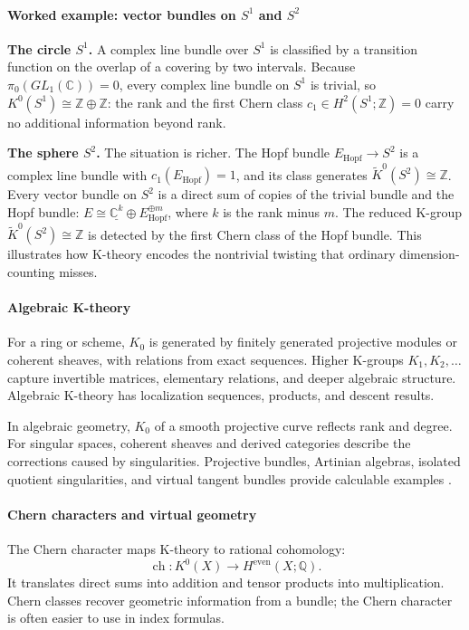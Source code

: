\paragraph{Worked example: vector bundles on $S^1$ and $S^2$}
\textbf{The circle $S^1$.} A complex line bundle over $S^1$ is classified by a transition function on the overlap of a covering by two intervals. Because $\pi_0(GL_1(\mathbb{C}))=0$, every complex line bundle on $S^1$ is trivial, so $K^0(S^1)\cong\mathbb{Z}\oplus\mathbb{Z}$: the rank and the first Chern class $c_1\in H^2(S^1;\mathbb{Z})=0$ carry no additional information beyond rank.

\textbf{The sphere $S^2$.} The situation is richer. The Hopf bundle $E_{\mathrm{Hopf}}\to S^2$ is a complex line bundle with $c_1(E_{\mathrm{Hopf}})=1$, and its class generates $\widetilde{K}^0(S^2)\cong\mathbb{Z}$. Every vector bundle on $S^2$ is a direct sum of copies of the trivial bundle and the Hopf bundle: $E\cong\underline{\mathbb{C}^k}\oplus E_{\mathrm{Hopf}}^{\oplus m}$, where $k$ is the rank minus $m$. The reduced K-group $\widetilde{K}^0(S^2)\cong\mathbb{Z}$ is detected by the first Chern class of the Hopf bundle. This illustrates how K-theory encodes the nontrivial twisting that ordinary dimension-counting misses.

\paragraph{Algebraic K-theory}
For a ring or scheme, $K_0$ is generated by finitely generated projective modules or coherent sheaves, with relations from exact sequences. Higher K-groups $K_1,K_2,\ldots$ capture invertible matrices, elementary relations, and deeper algebraic structure. Algebraic K-theory has localization sequences, products, and descent results.

In algebraic geometry, $K_0$ of a smooth projective curve reflects rank and degree. For singular spaces, coherent sheaves and derived categories describe the corrections caused by singularities. Projective bundles, Artinian algebras, isolated quotient singularities, and virtual tangent bundles provide calculable examples \cite{k_theory_ref3}.

\paragraph{Chern characters and virtual geometry}
The Chern character maps K-theory to rational cohomology:
\[
\operatorname{ch}:K^0(X)\longrightarrow H^{\mathrm{even}}(X;\mathbb Q).
\]
It translates direct sums into addition and tensor products into multiplication. Chern classes recover geometric information from a bundle; the Chern character is often easier to use in index formulas.

